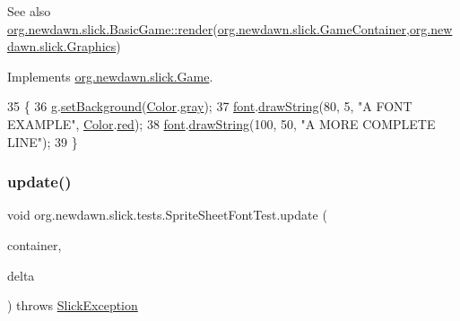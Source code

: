 \begin{DoxySeeAlso}{See also}
\mbox{\hyperlink{interfaceorg_1_1newdawn_1_1slick_1_1_game_af1a4670d43eb3ba04dfcf55ab1975b64}{org.\+newdawn.\+slick.\+Basic\+Game\+::render}}(\mbox{\hyperlink{classorg_1_1newdawn_1_1slick_1_1_game_container}{org.\+newdawn.\+slick.\+Game\+Container}},\mbox{\hyperlink{classorg_1_1newdawn_1_1slick_1_1_graphics}{org.\+newdawn.\+slick.\+Graphics}}) 
\end{DoxySeeAlso}


Implements \mbox{\hyperlink{interfaceorg_1_1newdawn_1_1slick_1_1_game_af1a4670d43eb3ba04dfcf55ab1975b64}{org.\+newdawn.\+slick.\+Game}}.


\begin{DoxyCode}
35                                                            \{
36       g.\mbox{\hyperlink{classorg_1_1newdawn_1_1slick_1_1_graphics_a792bcb1d729c35041b99b9eb2211649a}{setBackground}}(\mbox{\hyperlink{classorg_1_1newdawn_1_1slick_1_1_color}{Color}}.\mbox{\hyperlink{classorg_1_1newdawn_1_1slick_1_1_color_a51bc0a8031fa678db5b35c26696b1d9f}{gray}});
37       \mbox{\hyperlink{classorg_1_1newdawn_1_1slick_1_1tests_1_1_sprite_sheet_font_test_a910b79c0adb99fde6f3122070d2a9dfa}{font}}.\mbox{\hyperlink{interfaceorg_1_1newdawn_1_1slick_1_1_font_a40b19381efcb64ce1ce4d446eff1e350}{drawString}}(80, 5, \textcolor{stringliteral}{"A FONT EXAMPLE"}, \mbox{\hyperlink{classorg_1_1newdawn_1_1slick_1_1_color}{Color}}.\mbox{\hyperlink{classorg_1_1newdawn_1_1slick_1_1_color_aa9735c6217da1b515582e7f2273daeb6}{red}});
38       \mbox{\hyperlink{classorg_1_1newdawn_1_1slick_1_1tests_1_1_sprite_sheet_font_test_a910b79c0adb99fde6f3122070d2a9dfa}{font}}.\mbox{\hyperlink{interfaceorg_1_1newdawn_1_1slick_1_1_font_a40b19381efcb64ce1ce4d446eff1e350}{drawString}}(100, 50, \textcolor{stringliteral}{"A MORE COMPLETE LINE"});
39    \}
\end{DoxyCode}
\mbox{\label{classorg_1_1newdawn_1_1slick_1_1tests_1_1_sprite_sheet_font_test_a620ff32ef08af29724e0aa7e35889008}} 
\subsubsection{\texorpdfstring{update()}{update()}}
{\footnotesize\ttfamily void org.\+newdawn.\+slick.\+tests.\+Sprite\+Sheet\+Font\+Test.\+update (\begin{DoxyParamCaption}\item[{\mbox{\hyperlink{classorg_1_1newdawn_1_1slick_1_1_game_container}{Game\+Container}}}]{container,  }\item[{int}]{delta }\end{DoxyParamCaption}) throws \mbox{\hyperlink{classorg_1_1newdawn_1_1slick_1_1_slick_exception}{Slick\+Exception}}\hspace{0.3cm}{\ttfamily [inline]}}

